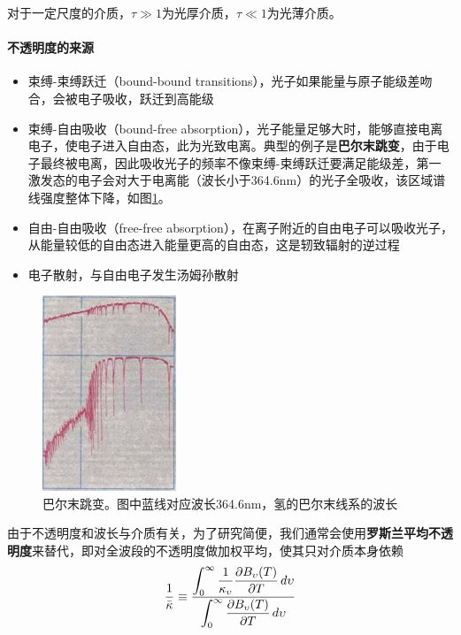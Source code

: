 \documentclass[openany]{ctexbook}
\begin{document}
对于一定尺度的介质，$\tau\gg1$为光厚介质，$\tau\ll1$为光薄介质。

\paragraph{不透明度的来源}
\begin{itemize}
  \item 束缚-束缚跃迁（bound-bound transitions），光子如果能量与原子能级差吻合，会被电子吸收，跃迁到高能级
  \item 束缚-自由吸收（bound-free absorption），光子能量足够大时，能够直接电离电子，使电子进入自由态，此为光致电离。典型的例子是\textbf{巴尔末跳变}，由于电子最终被电离，因此吸收光子的频率不像束缚-束缚跃迁要满足能级差，第一激发态的电子会对大于电离能（波长小于364.6\;nm）的光子全吸收，该区域谱线强度整体下降，如图\ref{fig:balmerjump}。
  \item 自由-自由吸收（free-free absorption），在离子附近的自由电子可以吸收光子，从能量较低的自由态进入能量更高的自由态，这是轫致辐射的逆过程
  \item 电子散射，与自由电子发生汤姆孙散射
\end{itemize}

\begin{figure}[hbt]
  \centering
  \includegraphics[width=4cm]{chapters/09/balmerjump}
  \caption{巴尔末跳变。图中蓝线对应波长364.6\;nm，氢的巴尔末线系的波长}
  \label{fig:balmerjump}
\end{figure}

由于不透明度和波长与介质有关，为了研究简便，我们通常会使用\textbf{罗斯兰平均不透明度}来替代，即对全波段的不透明度做加权平均，使其只对介质本身依赖
\begin{equation}
  {1\over \bar\kappa} \equiv{\displaystyle\int_0^\infty {1\over \kappa_\upsilon}{\partial B_\upsilon(T)\over \partial T}\,d\upsilon \over \displaystyle\int_0^\infty{\partial B_\upsilon(T)\over \partial T}\,d\upsilon}
\end{equation}
\end{document}
